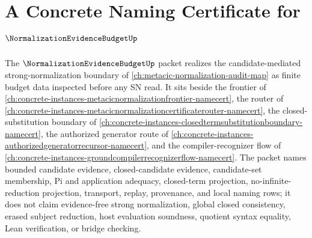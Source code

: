 \chapter{A Concrete Naming Certificate for $\NormalizationEvidenceBudgetUp$}
\label{ch:concrete-instances-normalization-evidence-budget-namecert}

The $\NormalizationEvidenceBudgetUp$ packet realizes the candidate-mediated strong-normalization boundary of \autoref{ch:metacic-normalization-audit-map} as finite budget data inspected before any SN read. It sits beside the frontier of \autoref{ch:concrete-instances-metacicnormalizationfrontier-namecert}, the router of \autoref{ch:concrete-instances-metacicnormalizationcertificaterouter-namecert}, the closed-substitution boundary of \autoref{ch:concrete-instances-closedtermsubstitutionboundary-namecert}, the authorized generator route of \autoref{ch:concrete-instances-authorizedgeneratorrecursor-namecert}, and the compiler-recognizer flow of \autoref{ch:concrete-instances-groundcompilerrecognizerflow-namecert}. The packet names bounded candidate evidence, closed-candidate evidence, candidate-set membership, Pi and application adequacy, closed-term projection, no-infinite-reduction projection, transport, replay, provenance, and local naming rows; it does not claim evidence-free strong normalization, global closed consistency, erased subject reduction, host evaluation soundness, quotient syntax equality, Lean verification, or bridge checking.

